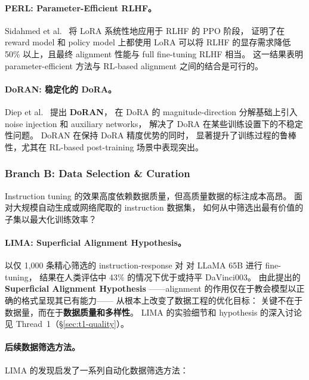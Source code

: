 \paragraph{PERL: Parameter-Efficient RLHF。}
Sidahmed et al.\ \cite{sidahmed2024perl} 将 LoRA 系统性地应用于 RLHF 的 PPO 阶段，
证明了在 reward model 和 policy model 上都使用 LoRA 可以将
RLHF 的显存需求降低 50\% 以上，且最终 alignment 性能与 full fine-tuning RLHF 相当。
这一结果表明 parameter-efficient 方法与 RL-based alignment 之间的结合是可行的。

\paragraph{DoRAN: 稳定化的 DoRA。}
Diep et al.\ \cite{diep2025doran} 提出 \textbf{DoRAN}，
在 DoRA 的 magnitude-direction 分解基础上引入 noise injection 和 auxiliary networks，
解决了 DoRA 在某些训练设置下的不稳定性问题。
DoRAN 在保持 DoRA 精度优势的同时，
显著提升了训练过程的鲁棒性，尤其在 RL-based post-training 场景中表现突出。

\subsubsection{Branch B: Data Selection \& Curation}
\label{sec:t7-data-selection}

\begin{problembox}
Instruction tuning 的效果高度依赖数据质量，但高质量数据的标注成本高昂。
面对大规模自动生成或网络爬取的 instruction 数据集，
如何从中筛选出最有价值的子集以最大化训练效率？
\end{problembox}

\paragraph{LIMA: Superficial Alignment Hypothesis。}
 以仅 1,000 条精心筛选的 instruction-response 对
对 LLaMA 65B 进行 fine-tuning，
结果在人类评估中 43\% 的情况下优于或持平 DaVinci003。
由此提出的 \textbf{Superficial Alignment Hypothesis}
——alignment 的作用仅在于教会模型以正确的格式呈现其已有能力——
从根本上改变了数据工程的优化目标：
关键不在于数据量，而在于\textbf{数据质量和多样性}。
LIMA 的实验细节和 hypothesis 的深入讨论见 Thread~1（\S\ref{sec:t1-quality}）。

\paragraph{后续数据筛选方法。}
LIMA 的发现启发了一系列自动化数据筛选方法：

